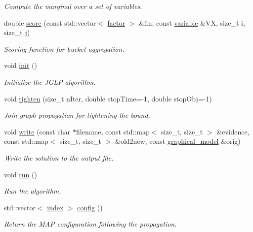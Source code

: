 \begin{DoxyCompactItemize}
\begin{DoxyCompactList}\small\item\em Compute the marginal over a set of variables. \end{DoxyCompactList}\item 
double \hyperlink{classmerlin_1_1jglp_acd88ee331ca7257fcc0ee1d70c2fe24c}{score} (const std\+::vector$<$ \hyperlink{classmerlin_1_1factor}{factor} $>$ \&fin, const \hyperlink{classmerlin_1_1variable}{variable} \&V\+X, size\+\_\+t i, size\+\_\+t j)
\begin{DoxyCompactList}\small\item\em Scoring function for bucket aggregation. \end{DoxyCompactList}\item 
\hypertarget{classmerlin_1_1jglp_a834f4f3ac58d3286843ed1e1fb8552dc}{}void \hyperlink{classmerlin_1_1jglp_a834f4f3ac58d3286843ed1e1fb8552dc}{init} ()\label{classmerlin_1_1jglp_a834f4f3ac58d3286843ed1e1fb8552dc}

\begin{DoxyCompactList}\small\item\em Initialize the J\+G\+L\+P algorithm. \end{DoxyCompactList}\item 
void \hyperlink{classmerlin_1_1jglp_a8b61916d0cdfb09f2f45ab47d6c00872}{tighten} (size\+\_\+t n\+Iter, double stop\+Time=-\/1, double stop\+Obj=-\/1)
\begin{DoxyCompactList}\small\item\em Join graph propagation for tightening the bound. \end{DoxyCompactList}\item 
void \hyperlink{classmerlin_1_1jglp_a83ff20b8832c686a4d429e5c7b1379e2}{write} (const char $\ast$filename, const std\+::map$<$ size\+\_\+t, size\+\_\+t $>$ \&evidence, const std\+::map$<$ size\+\_\+t, size\+\_\+t $>$ \&old2new, const \hyperlink{classmerlin_1_1graphical__model}{graphical\+\_\+model} \&orig)
\begin{DoxyCompactList}\small\item\em Write the solution to the output file. \end{DoxyCompactList}\item 
void \hyperlink{classmerlin_1_1jglp_aa748730ca6abbe2359fb2497da674fb8}{run} ()
\begin{DoxyCompactList}\small\item\em Run the algorithm. \end{DoxyCompactList}\item 
\hypertarget{classmerlin_1_1jglp_af75558eff4ccc1ad72acc1af5af3cc79}{}std\+::vector$<$ \hyperlink{classmerlin_1_1graph_a5cade38832f47248573e921276f122d6}{index} $>$ \hyperlink{classmerlin_1_1jglp_af75558eff4ccc1ad72acc1af5af3cc79}{config} ()\label{classmerlin_1_1jglp_af75558eff4ccc1ad72acc1af5af3cc79}

\begin{DoxyCompactList}\small\item\em Return the M\+A\+P configuration following the propagation. \end{DoxyCompactList}\end{DoxyCompactItemize}

